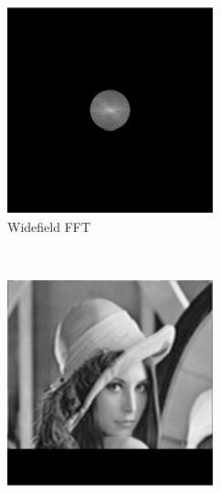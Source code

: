 \begin{figure}[h]
\begin{subfigure}[t]{0.23\textwidth}
      \centering
      \includegraphics[width=\textwidth]{widefield_slit/widefield_fft}
      \caption{Widefield \gls{FFT}}
  \end{subfigure}\\
  \begin{subfigure}[t]{0.23\textwidth}
      \centering
      \includegraphics[width=\textwidth]{widefield_slit/slitscanned_partial}

\end{subfigure}
\end{figure}
